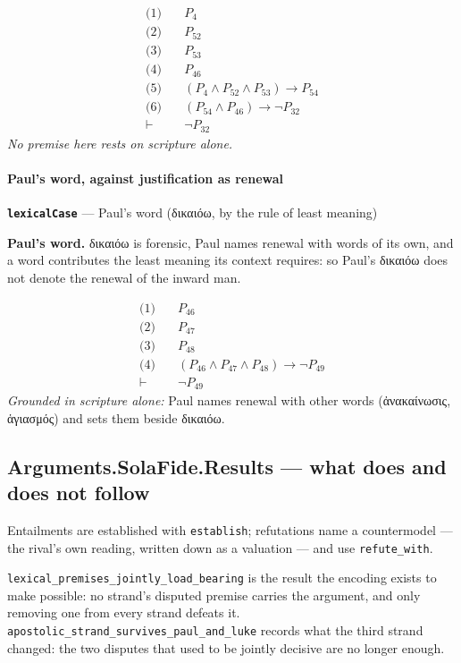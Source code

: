 \documentclass[11pt]{article}
\begin{document}
\begin{align*}
  \text{(1)} \quad & P_{4} \\
  \text{(2)} \quad & P_{52} \\
  \text{(3)} \quad & P_{53} \\
  \text{(4)} \quad & P_{46} \\
  \text{(5)} \quad & (P_{4} \land P_{52} \land P_{53}) \rightarrow P_{54} \\
  \text{(6)} \quad & (P_{54} \land P_{46}) \rightarrow \lnot P_{32} \\
  \vdash \quad & \lnot P_{32}
\end{align*}
\emph{No premise here rests on scripture alone.}
\paragraph*{Paul's word, against justification as renewal}
\leavevmode\par
\par\medskip\noindent\textbf{\texttt{lexical\allowbreak{}Case}} --- Paul's word (δικαιόω, by the rule of least meaning)\par\nobreak\noindent
\textbf{Paul's word.} δικαιόω is forensic, Paul names renewal with words of its own, and a word contributes the least meaning its context requires: so Paul's δικαιόω does not denote the renewal of the inward man.

\begin{align*}
  \text{(1)} \quad & P_{46} \\
  \text{(2)} \quad & P_{47} \\
  \text{(3)} \quad & P_{48} \\
  \text{(4)} \quad & (P_{46} \land P_{47} \land P_{48}) \rightarrow \lnot P_{49} \\
  \vdash \quad & \lnot P_{49}
\end{align*}
\emph{Grounded in scripture alone:} Paul names renewal with other words (ἀνακαίνωσις, ἁγιασμός) and sets them beside δικαιόω.
\subsection*{Arguments.SolaFide.Results — what does and does not follow}
Entailments are established with \texttt{establish}; refutations name a countermodel — the rival's own reading, written down as a valuation — and use \texttt{refute\_\allowbreak{}with}.

\texttt{lexical\_\allowbreak{}premises\_\allowbreak{}jointly\_\allowbreak{}load\_\allowbreak{}bearing} is the result the encoding exists to make possible: no strand's disputed premise carries the argument, and only removing one from every strand defeats it. \texttt{apostolic\_\allowbreak{}strand\_\allowbreak{}survives\_\allowbreak{}paul\_\allowbreak{}and\_\allowbreak{}luke} records what the third strand changed: the two disputes that used to be jointly decisive are no longer enough.
\end{document}
